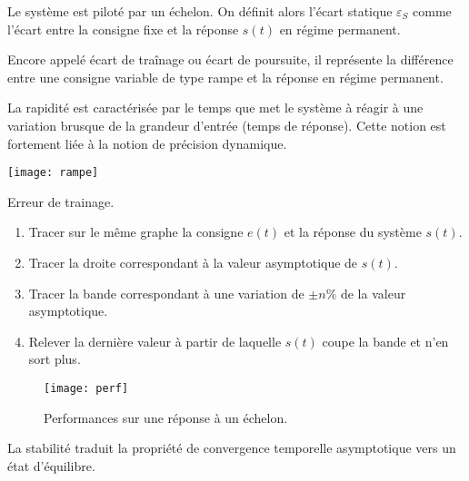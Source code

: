 \begin{defi}
Le système est piloté par un échelon. On définit alors l'écart statique $\varepsilon_S$ comme l'écart entre la consigne fixe et la réponse $s(t)$ en régime permanent.
\end{defi}

\begin{defi}
Encore appelé écart de traînage ou écart de poursuite, il représente la différence entre une consigne variable de type rampe et la réponse en régime permanent. 
\end{defi}

\begin{defi}[Rapidité]

La rapidité est caractérisée par le temps que met le système à réagir à une
variation brusque de la grandeur d'entrée (temps de réponse). Cette notion est
fortement liée à la notion de précision dynamique.
\end{defi}

\begin{marginfigure}[-2cm]
\texttt{[image: rampe]}
\caption{Erreur de trainage.}
\end{marginfigure}


\begin{methode}%

\begin{enumerate}
 \item Tracer sur le même graphe la consigne $e(t)$ et la réponse du système
$s(t)$.
\item Tracer la droite correspondant à la valeur asymptotique de $s(t)$.
\item Tracer la bande correspondant à une variation de $\pm n\%$ de la valeur
asymptotique.
\item Relever la dernière valeur à partir de laquelle $s(t)$ coupe la bande et
n'en sort plus.
\end{enumerate}
\end{methode}


\begin{figure}[!h]
\centering
\texttt{[image: perf]}
\caption{Performances sur une réponse à un échelon.}
\end{figure}

\begin{defi}[Stabilité]

La stabilité traduit la propriété de convergence temporelle asymptotique vers
un état d'équilibre. 
\end{defi}



